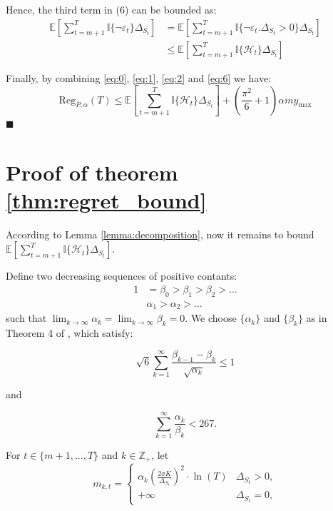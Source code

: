 \documentclass[opre,sglanonrev]{informs4}
\begin{document}
Hence, the third term in (6) can be bounded as:
\begin{equation}
    \label{eq:6}
	\begin{aligned}
		\mathbb{E}[\sum_{t=m+1}^{T}\mathbb{I}\{\lnot \varepsilon_t\}\Delta_{S_t}] &= \mathbb{E}[\sum_{t=m+1}^{T}\mathbb{I}\{\lnot \varepsilon_t. \Delta_{S_t}>0\}\Delta_{S_t}]\\
		&\leq \mathbb{E}[\sum_{t=m+1}^{T}\mathbb{I}\{\mathcal{H}_t\}\Delta_{S_t}]
	\end{aligned}
\end{equation}

Finally, by combining \ref{eq:0}, \ref{eq:1}, \ref{eq:2} and \ref{eq:6}  we have:
$$
	\text{Reg}_{P,\alpha}(T) \leq \mathbb{E}[\sum_{t=m+1}^{T}\mathbb{I}\{\mathcal{H}_t\}\Delta_{S_t}] + (\frac{\pi^2}{6}+1)\alpha m y_{\text{max}}
$$
\hfill $\blacksquare$

\section{Proof of theorem \ref{thm:regret_bound}}
According to Lemma \ref{lemma:decomposition}, now it remains to bound $\mathbb{E}[\sum_{t=m+1}^{T}\mathbb{I}\{\mathcal{H}_t\}\Delta_{S_t}]$.

Define two decreasing sequences of positive contants:
$$\begin{aligned}
1 & =\beta_0>\beta_1>\beta_2>\ldots \\
 & \alpha_1>\alpha_2>\ldots
\end{aligned}$$
such that $\lim_{k \to \infty}\alpha_k = \lim_{k \to \infty}\beta_k=0$. We choose $\{\alpha_k\}$ and $\{\beta_k\}$ as in Theorem 4 of \citep{Kveton2014TightRB}, which satisfy:

\begin{equation}\sqrt{6}\sum_{k=1}^\infty\frac{\beta_{k-1}-\beta_k}{\sqrt{\alpha_k}}\leq1\end{equation}

and

\begin{equation}\sum_{k=1}^\infty\frac{\alpha_k}{\beta_k}<267.\end{equation}

For $t \in \{m+1,...,T\}$ and $k \in \mathbb{Z}_+$, let
$$m_{k,t}=
\begin{cases}
\alpha_k\left(\frac{2\sigma K}{\Delta_{S_t}}\right)^2\cdot \ln(T) & \Delta_{S_t}>0, \\
+\infty & \Delta_{S_t}=0,
\end{cases}$$
\end{document}
